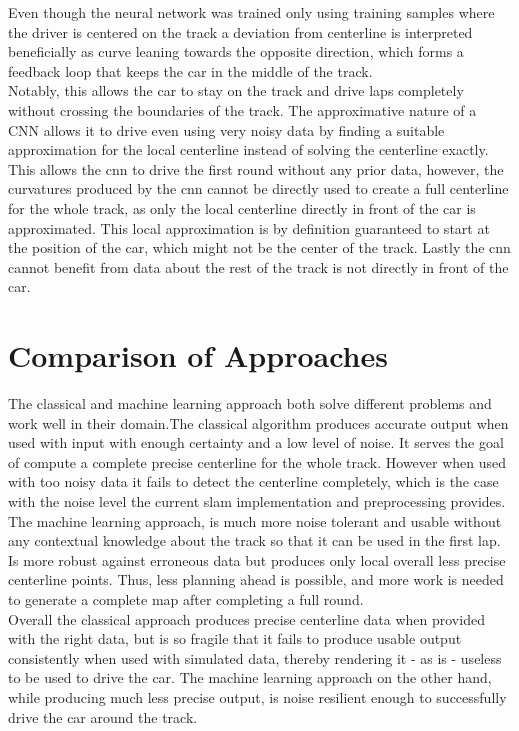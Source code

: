 Even though the neural network was trained only using training samples where the driver is centered on the track a deviation from centerline is interpreted beneficially as curve leaning towards the opposite direction, which forms a feedback loop that keeps the car in the middle of the track.\\
Notably, this allows the car to stay on the track and drive laps completely without crossing the boundaries of the track. The approximative nature of a CNN allows it to drive even using very noisy data by finding a suitable approximation for the local centerline instead of solving the centerline exactly. This allows the \ac{cnn} to drive the first round without any prior data, however, the curvatures produced by the \ac{cnn} cannot be directly used to create a full centerline for the whole track, as only the local centerline directly in front of the car is approximated. This local approximation is by definition guaranteed to start at the position of the car, which might not be the center of the track. Lastly the \ac{cnn} cannot benefit from data about the rest of the track is not directly in front of the car.



\section{Comparison of Approaches}

The classical and machine learning approach both solve different problems and work well in their domain.The classical algorithm produces accurate output when used with input with enough certainty and a low level of noise. It serves the goal of compute a complete precise centerline for the whole track. However when used with too noisy data it fails to detect the centerline completely, which is the case with the noise level the current slam implementation and preprocessing provides. The machine learning approach, is much more noise tolerant and usable without any contextual knowledge about the track so that it can be used in the first lap. Is more robust against erroneous data but produces only local overall less precise centerline points. Thus, less planning ahead is possible, and more work is needed to generate a complete map after completing a full round.\\
Overall the classical approach produces precise centerline data when provided with the right data, but is so fragile that it fails to produce usable output consistently when used with simulated data, thereby rendering it - as is - useless to be used to drive the car. The machine learning approach on the other hand, while producing much less precise output, is noise resilient enough to successfully drive the car around the track.

